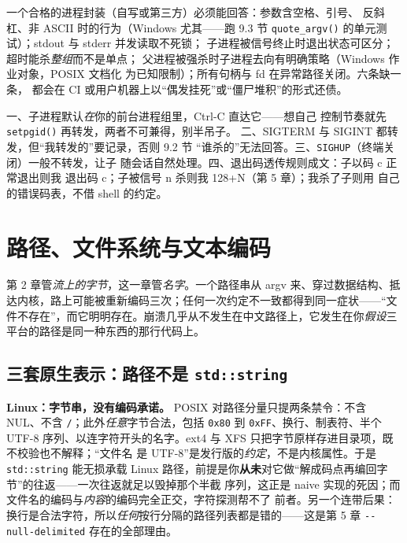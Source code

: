 \documentclass[12pt,a4paper,fontset=fandol]{ctexbook}
\newcommand{\Fn}[1]{\texttt{#1()}}
\newcommand{\Tp}[1]{\texttt{#1}}
\newcommand{\Opt}[1]{\texttt{-\/-#1}}
\begin{document}
\begin{bestpractice}[title={封装层的验收清单}]
一个合格的进程封装（自写或第三方）必须能回答：参数含空格、引号、
反斜杠、非 ASCII 时的行为（Windows 尤其——跑 9.3 节
\Fn{quote\_argv} 的单元测试）；stdout 与 stderr 并发读取不死锁；
子进程被信号终止时退出状态可区分；超时能杀\emph{整组}而不是单点；
父进程被强杀时子进程去向有明确策略（Windows 作业对象，POSIX 文档化
为已知限制）；所有句柄与 fd 在异常路径关闭。六条缺一条，
都会在 CI 或用户机器上以``偶发挂死''或``僵尸堆积''的形式还债。
\end{bestpractice}

\begin{guideline}[title={转发信号的四条纪律}]
一、子进程默认\emph{在}你的前台进程组里，Ctrl-C 直达它——想自己
控制节奏就先 \Fn{setpgid} 再转发，两者不可兼得，别半吊子。
二、SIGTERM 与 SIGINT 都转发，但``我转发的''要记录，否则 9.2 节
``谁杀的''无法回答。三、\Tp{SIGHUP}（终端关闭）一般不转发，让子
随会话自然处理。四、退出码透传规则成文：子以码 c 正常退出则我
退出码 c；子被信号 n 杀则我 128+N（第 5 章）；我杀了子则用
自己的错误码表，不借 shell 的约定。
\end{guideline}

\chapter{路径、文件系统与文本编码}

第 2 章管\emph{流上的字节}，这一章管\emph{名字}。一个路径串从 argv 来、穿过数据结构、抵达内核，路上可能被重新编码三次；任何一次约定不一致都得到同一症状——``文件不存在''，而它明明存在。崩溃几乎从不发生在中文路径上，它发生在你\emph{假设}三平台的路径是同一种东西的那行代码上。

\section{三套原生表示：路径不是 \Tp{std::string}}

\textbf{Linux：字节串，没有编码承诺。} POSIX 对路径分量只提两条禁令：不含 NUL、不含
\Tp{/}；此外\emph{任意}字节合法，包括 \Tp{0x80} 到 \Tp{0xFF}、换行、制表符、半个 UTF-8
序列、以连字符开头的名字。ext4 与 XFS 只把字节原样存进目录项，既不校验也不解释；``文件名
是 UTF-8''是发行版的\emph{约定}，不是内核属性。于是 \Tp{std::string} 能无损承载 Linux
路径，前提是你\textbf{从未}对它做``解成码点再编回字节''的往返——一次往返就足以毁掉那个半截
序列，这正是 naive 实现的死因；而文件名的编码与\emph{内容}的编码完全正交，字符探测帮不了
前者。另一个连带后果：换行是合法字符，所以\emph{任何}按行分隔的路径列表都是错的——这是第 5 章 \Opt{null-delimited} 存在的全部理由。
\end{document}
